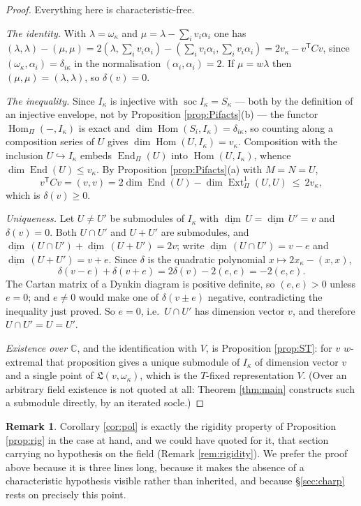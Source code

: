 \documentclass[reqno]{amsart}
\theoremstyle{plain}
\theoremstyle{definition}
\newtheorem{remark}[theorem]{Remark}
\DeclareMathOperator{\soc}{soc}
\DeclareMathOperator{\Hom}{Hom}
\DeclareMathOperator{\Ext}{Ext}
\DeclareMathOperator{\End}{End}
\newcommand{\dimv}{\underline{\dim}\,}
\newcommand{\la}{\lambda}
\newcommand{\al}{\alpha}
\newcommand{\om}{\omega}
\newcommand{\ka}{\kappa}
\newcommand{\Pia}{\Pi}
\begin{document}
\begin{proof}
Everything here is characteristic-free.

\emph{The identity.}  With $\la=\om_\ka$ and $\mu=\la-\sum_iv_i\al_i$ one has
$(\la,\la)-(\mu,\mu)=2(\la,\sum_iv_i\al_i)-(\sum_iv_i\al_i,\sum_iv_i\al_i)
=2v_\ka-v^{\mathsf T}Cv$, since
$(\om_\ka,\al_i)=\delta_{i\ka}$ in the normalisation $(\al_i,\al_i)=2$.  If
$\mu=w\la$ then $(\mu,\mu)=(\la,\la)$, so $\delta(v)=0$.

\emph{The inequality.}  Since $I_\ka$ is injective with
$\soc I_\ka=S_\ka$ --- both by the definition of an injective envelope, not
by Proposition \ref{prop:Pifacts}(b) --- the functor
$\Hom_\Pia(-,I_\ka)$ is exact and $\dim\Hom(S_i,I_\ka)=\delta_{i\ka}$, so
counting along a composition series of $U$ gives $\dim\Hom(U,I_\ka)=v_\ka$.
Composition with the inclusion $U\hookrightarrow I_\ka$ embeds
$\End_\Pia(U)$ into $\Hom(U,I_\ka)$, whence $\dim\End(U)\le v_\ka$.  By
Proposition \ref{prop:Pifacts}(a) with $M=N=U$,
\[
   v^{\mathsf T}Cv=(v,v)=2\dim\End(U)-\dim\Ext^1_\Pia(U,U)\ \le\ 2v_\ka ,
\]
which is $\delta(v)\ge0$.

\emph{Uniqueness.}  Let $U\ne U'$ be submodules of $I_\ka$ with
$\dimv U=\dimv U'=v$ and $\delta(v)=0$.  Both $U\cap U'$ and $U+U'$ are
submodules, and $\dimv(U\cap U')+\dimv(U+U')=2v$; write
$\dimv(U\cap U')=v-e$ and $\dimv(U+U')=v+e$.  Since $\delta$ is the quadratic
polynomial $x\mapsto2x_\ka-(x,x)$,
\[
   \delta(v-e)+\delta(v+e)=2\delta(v)-2(e,e)=-2(e,e).
\]
The Cartan matrix of a Dynkin diagram is positive definite, so $(e,e)>0$ unless
$e=0$; and $e\ne0$ would make one of $\delta(v\pm e)$ negative, contradicting
the inequality just proved.  So $e=0$, i.e.\ $U\cap U'$ has dimension vector
$v$, and therefore $U\cap U'=U=U'$.

\emph{Existence over $\mathbb{C}$}, and the identification with $V$, is
Proposition \ref{prop:ST}: for $v$ $w$-extremal that proposition gives a
unique submodule of $I_\ka$ of dimension vector $v$ and a single point of
$\mathfrak{L}(v,\om_\ka)$, which is the $T$-fixed representation $V$.
(Over an arbitrary field existence is not quoted at all: Theorem
\ref{thm:main} constructs such a submodule directly, by an iterated socle.)
\end{proof}

\begin{remark}
Corollary \ref{cor:pol} is exactly the rigidity property of Proposition
\ref{prop:rig} in the case at hand, and we could have quoted \cite[\S3]{BKT}
for it, that section carrying no hypothesis on the field (Remark
\ref{rem:rigidity}).  We prefer the proof above because it is three lines long,
because it makes the absence of a characteristic hypothesis visible rather than
inherited, and because \S\ref{sec:charp} rests on precisely this point.
\end{remark}
\end{document}

